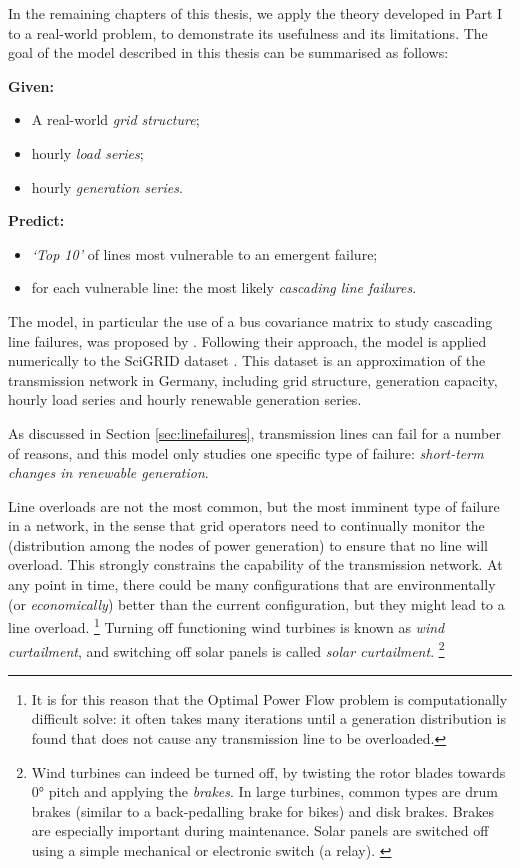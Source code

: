 \documentclass[main.tex]{subfiles}
\begin{document}
In the remaining chapters of this thesis, we apply the theory developed in Part I to a real-world problem, to demonstrate its usefulness and its limitations. The goal of the model described in this thesis can be summarised as follows:

\textbf{Given:}
\begin{itemize}
    \item A real-world \emph{grid structure};
    \item hourly \emph{load series};
    \item hourly \emph{generation series}.
\end{itemize}
\textbf{Predict:}
\begin{itemize}
    \item \emph{`Top 10'} of lines most vulnerable to an emergent failure;
    \item for each vulnerable line: the most likely \emph{cascading line failures}.
\end{itemize}
The model, in particular the use of a bus covariance matrix to study cascading line failures, was proposed by \citet{Nesti2018emergentfailures}.\nocite{Nesti2018supplemental} Following their approach, the model is applied numerically to the SciGRID dataset \citep{SciGRIDv0.2}. This dataset is an approximation of the transmission network in Germany, including grid structure, generation capacity, hourly load series and hourly renewable generation series.

As discussed in Section \ref{sec:linefailures}, transmission lines can fail for a number of reasons, and this model only studies one specific type of failure: \emph{short-term changes in renewable generation}.

Line overloads are not the most common, but the most imminent type of failure in a network, in the sense that grid operators need to continually monitor the  (distribution among the nodes of power generation) to ensure that no line will overload.
This strongly constrains the capability of the transmission network. At any point in time, there could be many configurations that are environmentally (or \emph{economically}) better than the current configuration, but they might lead to a line overload.%
\footnote{It is for this reason that the Optimal Power Flow problem is computationally difficult solve: it often takes many iterations until a generation distribution is found that does not cause any transmission line to be overloaded.}
Turning off functioning wind turbines is known as \emph{wind curtailment}, and switching off solar panels is called \emph{solar curtailment}.%
\footnote{Wind turbines can indeed be turned off, by twisting the rotor blades towards $0\si{\degree}$ pitch and applying the \emph{brakes}. In large turbines, common types are drum brakes (similar to a back-pedalling brake for bikes) and disk brakes. Brakes are especially important during maintenance.
Solar panels are switched off using a simple mechanical or electronic switch (a relay). \citep{Denholm2015}}
\end{document}
